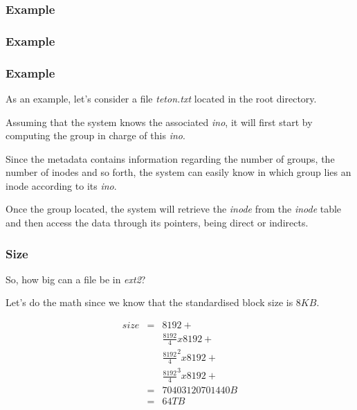 \begin{frame}
  \frametitle{Example}

  \begin{center}
  \end{center}
\end{frame}


\begin{frame}
  \frametitle{Example}

  \begin{center}
  \end{center}
\end{frame}


\begin{frame}
  \frametitle{Example}

  As an example, let's consider a file \textit{teton.txt} located in the root
  directory.

  \-

  Assuming that the system knows the associated \textit{ino}, it will first
  start by computing the group in charge of this \textit{ino}.

  \-

  Since the metadata contains information regarding the number of groups,
  the number of inodes and so forth, the system can easily know in which
  group lies an inode according to its \textit{ino}.

  \-

  Once the group located, the system will retrieve the \textit{inode} from
  the \textit{inode} table and then access the data through its pointers,
  being direct or indirects.
\end{frame}


\begin{frame}
  \frametitle{Size}

  So, how big can a file be in \textit{ext2}?

  \-

  Let's do the math since we know that the standardised block size is $8 KB$.

  \-

  \begin{eqnarray*}
    size & = & 8192 + \\
         &   & \frac{8192}{4} x 8192 + \\
         &   & \frac{8192}{4}^{2} x 8192 + \\
         &   & \frac{8192}{4}^{3} x 8192 + \\
         & = & 70403120701440 B \\
         & = & 64 TB \\
  \end{eqnarray*}
\end{frame}

